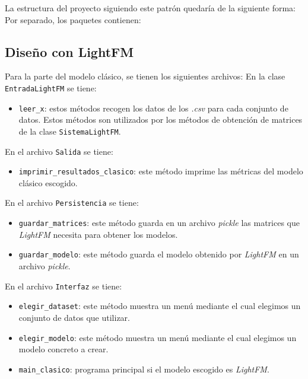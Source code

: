 
La estructura del proyecto siguiendo este patrón quedaría de la siguiente forma:
Por separado, los paquetes contienen:

\subsection{Diseño con LightFM}\label{diseño-lightfm}
Para la parte del modelo clásico, se tienen los siguientes archivos:
En la clase \texttt{EntradaLightFM} se tiene:
\begin{itemize}
\tightlist
\item \texttt{leer\_x}: estos métodos recogen los datos de los \textit{.csv} para cada conjunto de datos. Estos métodos son utilizados por los métodos de obtención de matrices de la clase \texttt{SistemaLightFM}.
\end{itemize}

En el archivo \texttt{Salida} se tiene:
\begin{itemize}
\tightlist
\item \texttt{imprimir\_resultados\_clasico}: este método imprime las métricas del modelo clásico escogido.
\end{itemize}

En el archivo \texttt{Persistencia} se tiene:
\begin{itemize}
\tightlist
\item \texttt{guardar\_matrices}: este método guarda en un archivo \textit{pickle} las matrices que \textit{LightFM} necesita para obtener los modelos.
\item \texttt{guardar\_modelo}: este método guarda el modelo obtenido por \textit{LightFM} en un archivo \textit{pickle}.
\end{itemize}

En el archivo \texttt{Interfaz} se tiene:
\begin{itemize}
\tightlist
\item \texttt{elegir\_dataset}: este método muestra un menú mediante el cual elegimos un conjunto de datos que utilizar.
\item \texttt{elegir\_modelo}: este método muestra un menú mediante el cual elegimos un modelo concreto a crear. 
\item \texttt{main\_clasico}: programa principal si el modelo escogido es \textit{LightFM}. 
\end{itemize}

